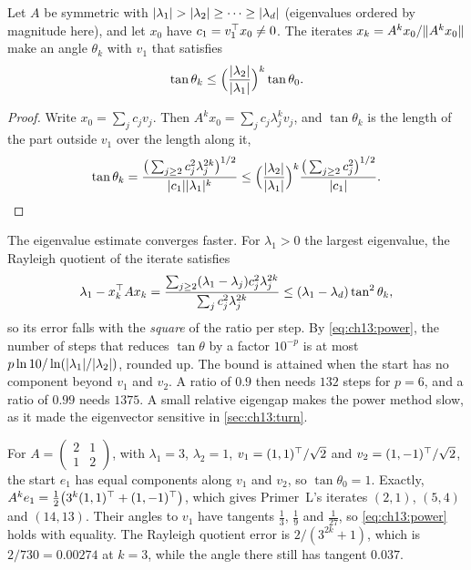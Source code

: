 \begin{theorem}\label{thm:ch13:power}
Let $A$ be symmetric with $\lvert \lambda_1\rvert>\lvert \lambda_2\rvert\ge\dots\ge\lvert \lambda_d\rvert$
(eigenvalues ordered by magnitude here), and let $x_0$ have $c_1=v_1^{\top} x_0\ne0$. The
iterates $x_k=A^kx_0/\lVert A^kx_0\rVert$ make an angle $\theta_k$ with $v_1$ that satisfies
\begin{equation}\label{eq:ch13:power}
\tan\theta_k\le\Big(\frac{\lvert \lambda_2\rvert}{\lvert \lambda_1\rvert}\Big)^k\tan\theta_0 .
\end{equation}
\end{theorem}

\begin{proof}
Write $x_0=\sum_jc_jv_j$. Then $A^kx_0=\sum_jc_j\lambda_j^kv_j$, and
$\tan\theta_k$ is the length of the part outside $v_1$ over the length along it,
\[
\tan\theta_k=\frac{\big(\sum_{j\ge2}c_j^2\lambda_j^{2k}\big)^{1/2}}{\lvert c_1\rvert\lvert \lambda_1\rvert^k}
\le\Big(\frac{\lvert \lambda_2\rvert}{\lvert \lambda_1\rvert}\Big)^k\frac{\big(\sum_{j\ge2}c_j^2\big)^{1/2}}{\lvert c_1\rvert} .\qedhere
\]
\end{proof}

The eigenvalue estimate converges faster. For $\lambda_1>0$ the largest
eigenvalue, the Rayleigh quotient of the iterate satisfies
\begin{equation}\label{eq:ch13:rq}
\lambda_1-x_k^{\top} Ax_k=\frac{\sum_{j\ge2}(\lambda_1-\lambda_j)c_j^2\lambda_j^{2k}}{\sum_jc_j^2\lambda_j^{2k}}
\le(\lambda_1-\lambda_d)\tan^2\theta_k ,
\end{equation}
so its error falls with the \emph{square} of the ratio per step. By
\cref{eq:ch13:power}, the number of steps that reduces $\tan\theta$ by a factor
$10^{-p}$ is at most $p\ln10/\ln(\lvert \lambda_1\rvert/\lvert \lambda_2\rvert)$, rounded up.
The bound is attained when the start has no component beyond $v_1$ and $v_2$.
A ratio of $0.9$ then needs $132$ steps for $p=6$, and a ratio of $0.99$ needs $1375$.
A small relative eigengap makes the power method slow, as it made the eigenvector
sensitive in \cref{sec:ch13:turn}.

\begin{example}\label{ex:ch13:power}
For $A=\begin{pmatrix}2&1\\1&2\end{pmatrix}$, with $\lambda_1=3$, $\lambda_2=1$,
$v_1=(1,1)^{\top}/\sqrt2$ and $v_2=(1,-1)^{\top}/\sqrt2$, the start $e_1$ has equal
components along $v_1$ and $v_2$, so $\tan\theta_0=1$. Exactly,
$A^ke_1=\tfrac12\big(3^k(1,1)^{\top}+(1,-1)^{\top}\big)$, which gives Primer~L's iterates
$(2,1)$, $(5,4)$ and $(14,13)$. Their angles to $v_1$ have tangents
$\tfrac13$, $\tfrac19$ and $\tfrac1{27}$, so \cref{eq:ch13:power} holds with
equality. The Rayleigh quotient error is $2/(3^{2k}+1)$, which is
$2/730=0.00274$ at $k=3$, while the angle there still has tangent $0.037$.
\end{example}


